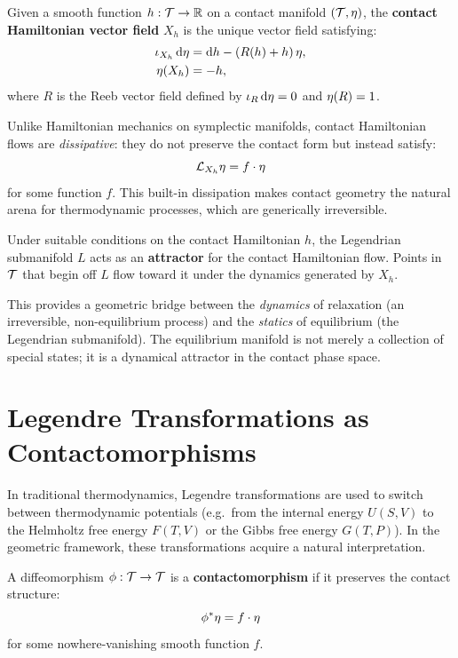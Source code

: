\begin{definition}
Given a smooth function $h: \mathcal{T} \to \mathbb{R}$ on a contact manifold $(\mathcal{T}, \eta)$, the \textbf{contact Hamiltonian vector field} $X_h$ is the unique vector field satisfying:
\begin{align}
\iota_{X_h}\,\dd\eta &= \dd h - (R(h) + h)\,\eta, \\
\eta(X_h) &= -h,
\end{align}
where $R$ is the Reeb vector field defined by $\iota_R\,\dd\eta = 0$ and $\eta(R) = 1$.
\end{definition}

Unlike Hamiltonian mechanics on symplectic manifolds, contact Hamiltonian flows are \emph{dissipative}: they do not preserve the contact form but instead satisfy:
\begin{equation}
\mathcal{L}_{X_h}\eta = f \cdot \eta
\end{equation}
for some function $f$. This built-in dissipation makes contact geometry the natural arena for thermodynamic processes, which are generically irreversible.

\begin{proposition}
Under suitable conditions on the contact Hamiltonian $h$, the Legendrian submanifold $L$ acts as an \textbf{attractor} for the contact Hamiltonian flow. Points in $\mathcal{T}$ that begin off $L$ flow toward it under the dynamics generated by $X_h$.
\end{proposition}

This provides a geometric bridge between the \emph{dynamics} of relaxation (an irreversible, non-equilibrium process) and the \emph{statics} of equilibrium (the Legendrian submanifold). The equilibrium manifold is not merely a collection of special states; it is a dynamical attractor in the contact phase space.

\section{Legendre Transformations as Contactomorphisms}

In traditional thermodynamics, Legendre transformations are used to switch between thermodynamic potentials (e.g.\ from the internal energy $U(S,V)$ to the Helmholtz free energy $F(T,V)$ or the Gibbs free energy $G(T,P)$). In the geometric framework, these transformations acquire a natural interpretation.

\begin{definition}[Contactomorphism]
A diffeomorphism $\phi: \mathcal{T} \to \mathcal{T}$ is a \textbf{contactomorphism} if it preserves the contact structure:
\begin{equation}
\phi^*\eta = f \cdot \eta
\end{equation}
for some nowhere-vanishing smooth function $f$.
\end{definition}

